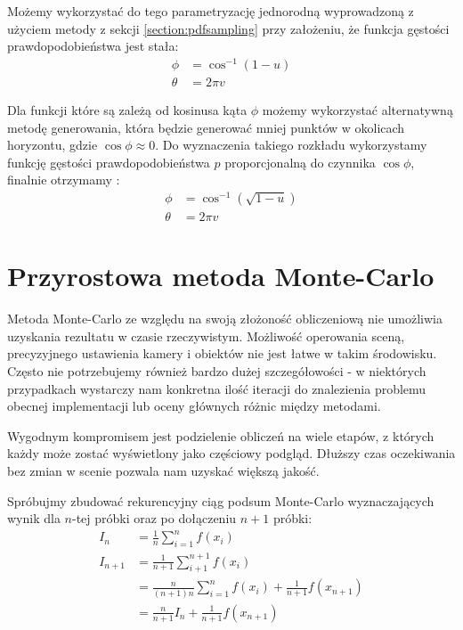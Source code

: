 \documentclass[../main.tex]{subfiles}
\begin{document}
Możemy wykorzystać do tego parametryzację jednorodną \cite{dammertz_2012, AdvancedCGRenderingEq} wyprowadzoną z użyciem metody z sekcji \ref{section:pdfsampling} przy założeniu, że funkcja gęstości prawdopodobieństwa jest stała:
\begin{align*}
	\phi &= \cos^{-1}(1-u) \\
	\theta &= 2 \pi v
\end{align*}

Dla funkcji które są zależą od kosinusa kąta $\phi$ możemy wykorzystać alternatywną metodę generowania, która będzie generować mniej punktów w okolicach horyzontu, gdzie $\cos\phi \approx 0$. Do wyznaczenia takiego rozkładu wykorzystamy funkcję gęstości prawdopodobieństwa $p$ proporcjonalną do czynnika $\cos \phi$, finalnie otrzymamy \cite{AdvancedCGRenderingEq}:
\begin{align*}
  \phi &= \cos^{-1}(\sqrt{1-u}) \\
  \theta &= 2 \pi v
\end{align*}

\section{Przyrostowa metoda Monte-Carlo}

Metoda Monte-Carlo ze względu na swoją złożoność obliczeniową nie umożliwia uzyskania rezultatu w czasie rzeczywistym. Możliwość operowania sceną, precyzyjnego ustawienia kamery i obiektów nie jest łatwe w takim środowisku. Często nie potrzebujemy również bardzo dużej szczegółowości - w niektórych przypadkach wystarczy nam konkretna ilość iteracji do znalezienia problemu obecnej implementacji lub oceny głównych różnic między metodami.

Wygodnym kompromisem jest podzielenie obliczeń na wiele etapów, z których każdy
może zostać wyświetlony jako częściowy podgląd. Dłuższy czas oczekiwania bez
zmian w scenie pozwala nam uzyskać większą jakość.

Spróbujmy zbudować rekurencyjny ciąg podsum Monte-Carlo wyznaczających wynik dla $n$-tej próbki oraz po dołączeniu $n+1$ próbki:
\begin{align*}
I_n &= \frac{1}{n} \sum_{i=1}^{n} f(x_i) \\
I_{n+1} &= \frac{1}{n+1} \sum_{i+1}^{n+1}f(x_i) \\
	&= \frac{n}{(n+1)n} \sum_{i=1}^{n}f(x_i) + \frac{1}{n+1}f(x_{n+1}) \\
	&= \frac{n}{n+1} I_{n} + \frac{1}{n+1}f(x_{n+1})
\end{align*}
\end{document}
